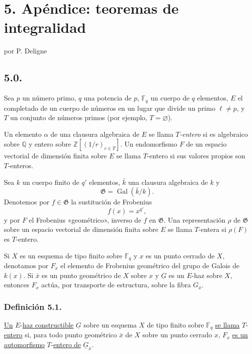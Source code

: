 \pageoriginale

\section*{5. Apéndice: teoremas de integralidad}
\begin{center}
por P. Deligne
\end{center}

\subsection*{5.0.}
Sea $p$ un número primo, $q$ una potencia de $p$, $\mathbb F_q$ un cuerpo
de $q$ elementos, $E$ el completado de un cuerpo de números en un lugar
que divide un primo $\ell\ne p$, y $T$ un conjunto de números primos (por
ejemplo, $T=\varnothing$).

Un elemento $\alpha$ de una clausura algebraica de $E$ se llama
\emph{$T$-entero} si es algebraico sobre $\mathbb Q$ y entero sobre
$\mathbb Z[(1/r)_{r\in T}]$. Un endomorfismo $F$ de un espacio vectorial
de dimensión finita sobre $E$ se llama $T$-entero si sus valores propios
son $T$-enteros.

Sea $k$ un cuerpo finito de $q'$ elementos, $\bar k$ una clausura
algebraica de $k$ y
\[
\mathfrak G=\operatorname{Gal}(\bar k/k).
\]
Denotemos por $f\in\mathfrak G$ la sustitución de Frobenius
\[
f(x)=x^{q'},
\]
y por $F$ el Frobenius «geométrico», inverso de $f$ en $\mathfrak G$.
Una representación $\rho$ de $\mathfrak G$ sobre un espacio vectorial de
dimensión finita sobre $E$ se llama $T$-entera si $\rho(F)$ es $T$-entero.

Si $X$ es un esquema de tipo finito sobre $\mathbb F_q$ y $x$ es un punto
cerrado de $X$, denotamos por $F_x$ el elemento de Frobenius geométrico del
grupo de Galois de $k(x)$. Si $\bar x$ es un punto geométrico de $X$ sobre
$x$ y $\underline G$ es un $E$-haz sobre $X$, entonces $F_x$ actúa, por
transporte de estructura, sobre la fibra $G_{\bar x}$.

\subsubsection*{Definición 5.1.}
\underline{Un} $E$-\underline{haz constructible} $\underline G$ sobre un esquema $X$ de tipo
finito sobre $\mathbb F_q$ \underline{se llama} $T$-\underline{entero} si, para todo punto
geométrico $\bar x$ de $X$ sobre un punto cerrado $x$, $F_x$ \underline{es un
automorfismo} $T$-\underline{entero de} $\underline G_{\bar x}$.

